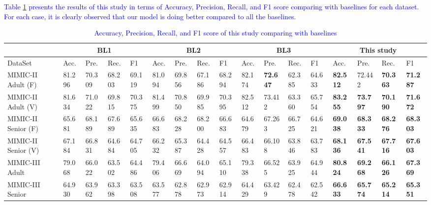 \textcolor{blue}{Table \ref{t:Summary_of_results_with_all_baselines2} presents the results of this study in terms of  Accuracy, Precision, Recall, and F1 score comparing with baselines for each dataset. For each case, it is clearly observed that our model is doing better compared to all the baselines.}

\begin{table}[h] 
	\tiny %
	\centering \caption{\textcolor{blue}{Accuracy, Precision, Recall, and F1 score of this study comparing with baselines}} 
	\begin{tabular}{|p{1.5cm}|p{0.6cm}|p{0.6cm}|p{0.6cm}|p{0.6cm}|p{0.6cm}|p{0.6cm}|p{0.6cm}|p{0.6cm}|p{0.6cm}|p{0.6cm}|p{0.6cm}|p{0.6cm}|p{0.6cm}|p{0.6cm}|p{0.6cm}|p{0.6cm}|}\hline	
		& \multicolumn{4}{|c|}{BL1} & \multicolumn{4}{|c|}{BL2} & \multicolumn{4}{|c|}{BL3} & \multicolumn{4}{|c|}{This study} \\\hline	
		DataSet	& Acc. & Pre. & Rec. & F1 & Acc. & Pre. & Rec. & F1 & Acc. & Pre. & Rec. & F1 & Acc. & Pre. & Rec. & F1 \\\hline	
		MIMIC-II Adult (F) & 81.296 & 70.309 & 68.203 & 69.119 & 81.094 & 69.856 & 67.186 & 68.294 & 82.174 & \textbf{72.647} & 62.385 & 64.633 & \textbf{82.512} & 72.442 & \textbf{70.363} & \textbf{71.287} \\\hline 
		MIMIC-II Adult (V) & 81.634 & 71.022 & 69.815 & 70.375 & 81.499 & 70.850 & 69.985 & 70.395 & 82.512 & 73.412 & 63.360 & 65.754 & \textbf{83.255} & \textbf{73.797} & \textbf{70.190} & \textbf{71.672} \\\hline  
		MIMIC-II Senior (F) & 65.681 & 68.189 & 67.689 & 65.635 & 66.683 & 68.228 & 68.200 & 66.683 & 64.679 & 67.263 & 66.725 & 64.621 & \textbf{69.038} & \textbf{68.333} & \textbf{68.276} & \textbf{68.303} \\\hline
		MIMIC-II Senior (V) & 67.184 & 66.831 & 64.684 & 64.705 & 66.232 & 65.387 & 64.428 & 64.557 & 66.483 & 66.108 & 63.846 & 63.783 & \textbf{68.136} & \textbf{67.541} & \textbf{67.716} & \textbf{67.603} \\\hline 
		MIMIC-III Adult & 79.068 & 66.022 & 63.502 & 64.486 & 79.406 & 66.669 & 64.094 & 65.110 & 79.338 & 66.525 & 63.925 & 64.944 & \textbf{80.824} & \textbf{69.268} & \textbf{66.126} & \textbf{67.369} \\\hline
		MIMIC-III Senior & 64.930 & 63.962 & 63.398 & 63.508 & 63.577 & 62.878 & 62.973 & 62.914 & 64.429 & 63.429 & 62.478 & 62.542 & \textbf{66.633} & \textbf{65.774} & \textbf{65.214} & \textbf{65.351} \\\hline  
		
	\end{tabular}
	\label{t:Summary_of_results_with_all_baselines2}
\end{table}

